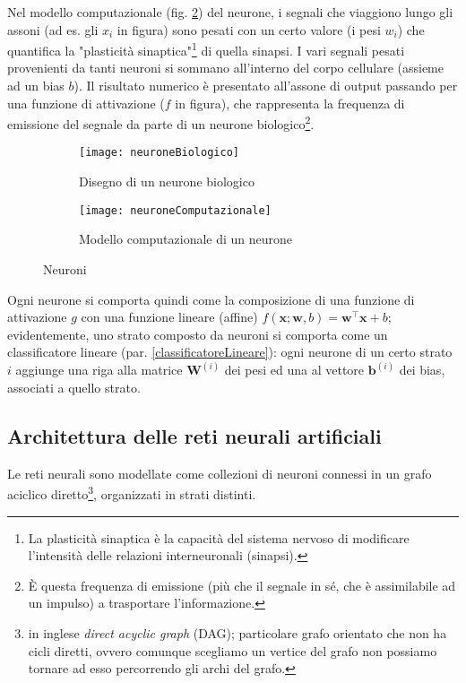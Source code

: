 Nel modello computazionale (fig. \ref{fig:neuroneComputazionale}) del neurone, i segnali che viaggiono lungo gli assoni (ad es. gli $x_i$ in figura) sono pesati con un certo valore (i pesi $w_i$) che quantifica la "plasticità sinaptica"\footnote{La plasticità sinaptica è la capacità del sistema nervoso di modificare l'intensità delle relazioni interneuronali (sinapsi).} di quella sinapsi. I vari segnali pesati provenienti da tanti neuroni si sommano all'interno del corpo cellulare (assieme ad un bias $b$). Il risultato numerico è presentato all'assone di output passando per una funzione di attivazione ($f$ in figura), che rappresenta la frequenza di emissione del segnale da parte di un neurone biologico\footnote{È questa frequenza di emissione (più che il segnale in sé, che è assimilabile ad un impulso) a trasportare l'informazione.}.

\begin{figure}[h]
\centering
\begin{subfigure}[b]{0.48\textwidth}
\texttt{[image: neuroneBiologico]}
\caption{Disegno di un neurone biologico}
\label{fig:neuroneBiologico}
\end{subfigure}
\begin{subfigure}[b]{0.48\textwidth}
\texttt{[image: neuroneComputazionale]}
\caption{Modello computazionale di un neurone}
\label{fig:neuroneComputazionale}
\end{subfigure}
\caption{Neuroni}
\label{fig:neurone}
\end{figure}

Ogni neurone si comporta quindi come la composizione di una funzione di attivazione $g$ con una funzione lineare (affine) $f(\mathbf{x}; \mathbf{w}, b)=\mathbf{w}^\top\mathbf{x}+b$; evidentemente, uno strato composto da neuroni si comporta come un classificatore lineare (par. \ref{classificatoreLineare}): ogni neurone di un certo strato $i$ aggiunge una riga alla matrice $\mathbf{W}^{(i)}$ dei pesi ed una al vettore $\mathbf{b}^{(i)}$ dei bias, associati a quello strato.\\

\subsection{Architettura delle reti neurali artificiali}
\label{architetturaANN}
Le reti neurali sono modellate come collezioni di neuroni connessi in un grafo aciclico diretto\footnote{in inglese \textit{direct acyclic graph} (DAG); particolare grafo orientato che non ha cicli diretti, ovvero comunque scegliamo un vertice del grafo non possiamo tornare ad esso percorrendo gli archi del grafo.}, organizzati in strati distinti.

